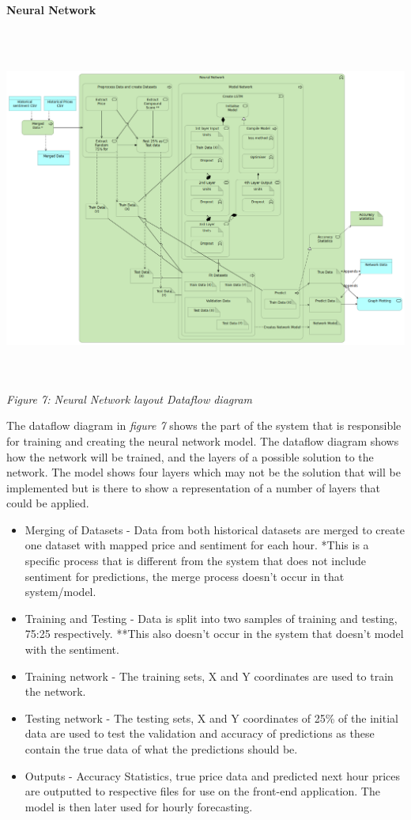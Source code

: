 \documentclass[oneside, 12pt]{article}
\begin{document}
		\textbf{Neural Network}
		\begin{center}
			\includegraphics[width=17cm,height=12cm]{images/Neural_Network.png}
			\textit{Figure 7: Neural Network layout Dataflow diagram}
		\end{center}
		The dataflow diagram in \textit{figure 7} shows the part of the system that is responsible for training and creating the neural network model. The dataflow diagram shows how the network will be trained, and the layers of a possible solution to the network. The model shows four layers which may not be the solution that will be implemented but is there to show a representation of a number of layers that could be applied.
		\begin{itemize}
			\item Merging of Datasets - Data from both historical datasets are merged to create one dataset with mapped price and sentiment for each hour. *This is a specific process that is different from the system that does not include sentiment for predictions, the merge process doesn't occur in that system/model.
			\item Training and Testing - Data is split into two samples of training and testing, 75:25 respectively. **This also doesn't occur in the system that doesn't model with the sentiment.
			\item Training network - The training sets, X and Y coordinates are used to train the network.
			\item Testing network - The testing sets, X and Y coordinates of 25\% of the initial data are used to test the validation and accuracy of predictions as these contain the true data of what the predictions should be.
			\item Outputs - Accuracy Statistics, true price data and predicted next hour prices are outputted to respective files for use on the front-end application. The model is then later used for hourly forecasting. 
		\end{itemize}
		
\end{document}
